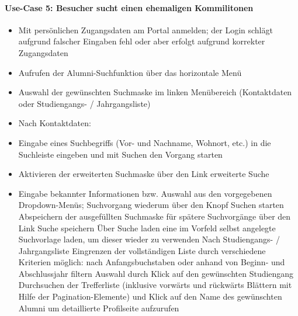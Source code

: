 \paragraph{Use-Case 5: Besucher sucht einen ehemaligen Kommilitonen}
\begin{itemize}

\item Mit persönlichen Zugangsdaten am Portal anmelden; der Login schlägt aufgrund falscher Eingaben fehl oder aber erfolgt aufgrund korrekter Zugangsdaten
\item Aufrufen der Alumni-Suchfunktion über das horizontale Menü
\item Auswahl der gewünschten Suchmaske im linken Menübereich (Kontaktdaten oder Studiengangs- / Jahrgangsliste)
\item Nach Kontaktdaten:
\item Eingabe eines Suchbegriffs (Vor- und Nachname, Wohnort, etc.) in die Suchleiste eingeben und mit Suchen den Vorgang starten
\item Aktivieren der erweiterten Suchmaske über den Link erweiterte Suche
\item Eingabe bekannter Informationen bzw. Auswahl aus den vorgegebenen Dropdown-Menüs; Suchvorgang wiederum über den Knopf Suchen starten
Abspeichern der ausgefüllten Suchmaske für spätere Suchvorgänge über den Link Suche speichern
Über Suche laden eine im Vorfeld selbst angelegte Suchvorlage laden, um dieser wieder zu verwenden
Nach Studiengangs- / Jahrgangsliste
Eingrenzen der vollständigen Liste durch verschiedene Kriterien möglich: nach Anfangsbuchstaben oder anhand von Beginn- und Abschlussjahr filtern
Auswahl durch Klick auf den gewünschten Studiengang
Durchsuchen der Trefferliste (inklusive vorwärts und rückwärts Blättern mit Hilfe der Pagination-Elemente) und Klick auf den Name des gewünschten Alumni um detaillierte Profilseite aufzurufen
\end{itemize}